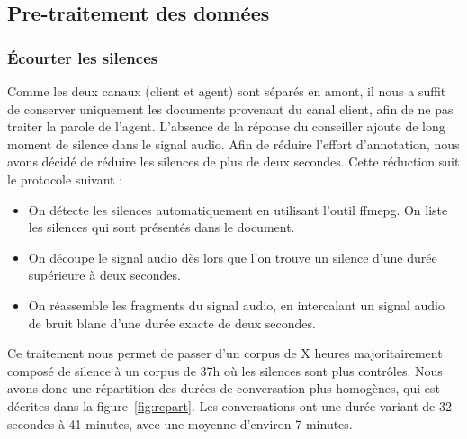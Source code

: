 \subsection{Pre-traitement des données}

\subsubsection{Écourter les silences}
Comme les deux canaux (client et agent) sont séparés en amont, il nous a suffit de conserver uniquement les documents provenant du canal client, afin de ne pas traiter la parole de l'agent.
L'absence de la réponse du conseiller ajoute de long moment de silence dans le signal audio. Afin de réduire l'effort d'annotation, nous avons décidé de réduire les silences de plus de deux secondes. Cette réduction suit le protocole suivant :
\begin{itemize}
  \item On détecte les silences automatiquement en utilisant l'outil ffmepg. On liste les silences qui sont présentés dans le document.
  \item On découpe le signal audio dès lors que l'on trouve un silence d'une durée supérieure à deux secondes.
  \item On réassemble les fragments du signal audio, en intercalant un signal audio de bruit blanc d'une durée exacte de deux secondes.
\end{itemize}

Ce traitement nous permet de passer d'un corpus de X heures majoritairement composé de silence à un corpus de 37h où les silences sont plus contrôles. Nous avons donc une répartition des durées de conversation plus homogènes, qui est décrites dans la figure~\ref{fig:repart}. Les conversations ont une durée variant de 32 secondes à 41 minutes, avec une moyenne d'environ 7 minutes.


